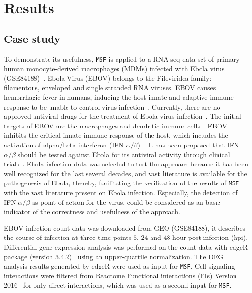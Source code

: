 \documentclass[10pt,a4paper,twocolumn]{article}
\begin{document}
\section*{Results}

\subsection*{Case study}

To demonstrate its usefulness, \texttt{MSF} is applied to a RNA-seq data
set of primary human monocyte-derived macrophages (MDMs) infected with
Ebola virus (GSE84188)~\cite{Olejnik}. Ebola Virus (EBOV) belongs to the Filoviridea family: filamentous, enveloped and single stranded RNA
viruses. EBOV causes hemorrhagic fever in humans, inducing the host innate
and adaptive immune response to be unable to control virus
infection~\cite{Prins}. Currently, there are no approved antiviral drugs
for the treatment of Ebola virus infection~\cite{Konde,Rhein}.  The initial
targets of EBOV are the macrophages and dendritic immune
cells~\cite{Falasca,Rhein}. EBOV inhibits the critical innate immune
response of the host, which includes the activation of alpha/beta
interferon (IFN-$\alpha / \beta$)~\cite{Prins,Konde,Cardenas}. It has been
proposed that IFN-$\alpha / \beta$ should be tested against Ebola for its
antiviral activity through clinical trials~\cite{Konde}. Ebola infection
data was selected to test the approach because it has been well recognized for the last several decades, and vast literature is available for the pathogenesis of Ebola, thereby, facilitating the verification of the results of
\texttt{MSF} with the vast literature present on Ebola
infection. Especially, the detection of IFN-$\alpha / \beta$ as point of
action for the virus, could be considered as an basic indicator of the
correctness and usefulness of the approach.

EBOV infection count data was downloaded from GEO (GSE84188), it describes the course of infection at three
time-points 6, 24 and 48 hour post infection (hpi). Differential
gene expression analysis was performed on the count data with edgeR package
(version 3.4.2)~\cite{edgeR} using an upper-quartile normalization. The DEG analysis results generated by edgeR
were used as input for \texttt{MSF}. Cell signaling interactions
were filtered from Reactome Functional interactions (FIs) Version
2016~\cite{Cytokegg} for only direct interactions, which was used as a second input for \texttt{MSF}.
\end{document}
